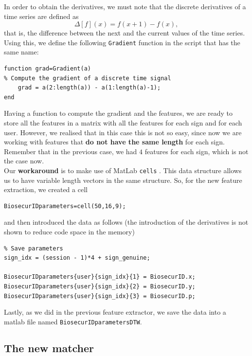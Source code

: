 \documentclass[a4paper]{article}
\def\inline{\lstinline[basicstyle=\ttfamily,keywordstyle={}]}
\begin{document}
{In order to obtain the derivatives, we must note that the discrete derivatives of a time series are defined as
\[
 \Delta [f](x)=f(x+1)-f(x),
\]
that is, the difference between the next and the current values of the time series. Using this, we define the following \inline{Gradient} function in the script that has the same name:
\begin{verbatim}
function grad=Gradient(a)
% Compute the gradient of a discrete time signal
    grad = a(2:length(a)) - a(1:length(a)-1);
end
\end{verbatim}

Having a function to compute the gradient and the features, we are ready to store all the features in a matrix with all the features for each sign and for each user. However, we realised that in this case this is not so easy, since now we are working with features that \textbf{do not have the same length} for each sign. Remember that in the previous case, we had \(4\) features for each sign, which is not the case now.\\

Our \textbf{workaround} is to make use of MatLab \inline{cells} \footnotemark. This data structure allows us to have variable length vectors in the same structure. So, for the new feature extraction, we created a cell
\begin{verbatim}
BiosecurIDparameters=cell(50,16,9);
\end{verbatim}
  and then introduced the data as follows (the introduction of the derivatives is not shown to reduce code space in the memory)
\begin{verbatim}
% Save parameters
sign_idx = (session - 1)*4 + sign_genuine;

BiosecurIDparameters{user}{sign_idx}{1} = BiosecurID.x; 
BiosecurIDparameters{user}{sign_idx}{2} = BiosecurID.y; 
BiosecurIDparameters{user}{sign_idx}{3} = BiosecurID.p;
\end{verbatim}



Lastly, as we did in the previous feature extractor, we save the data into a matlab file named \inline{BiosecurIDparametersDTW}.



\subsection*{The new matcher}

}
\end{document}
